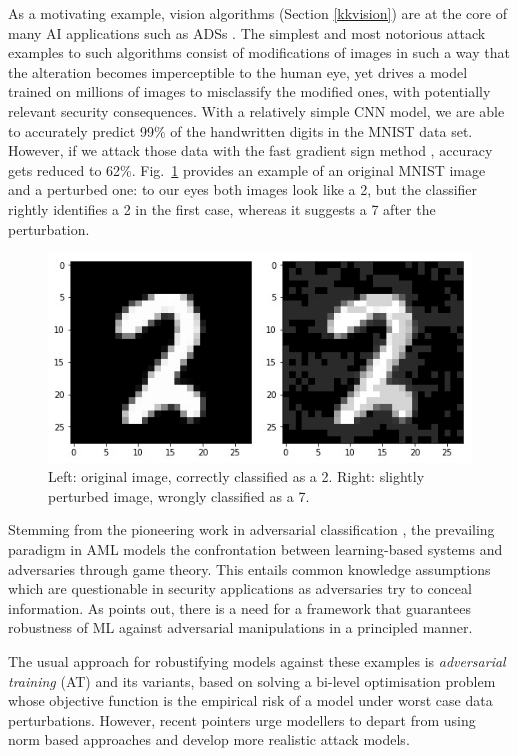 As a motivating example, vision algorithms (Section
\ref{kkvision}) are at the core of many AI 
applications such as ADSs \parencite{rumanos}. 
The simplest and most notorious attack examples to
such algorithms  
consist of modifications of images in such a way that the alteration becomes imperceptible to the human eye, yet drives a model trained on millions of images to misclassify the modified ones,
with potentially relevant security consequences.
With a relatively simple CNN model, we are able to accurately predict 99\% of the handwritten digits in the MNIST data set.
However, if we attack those data with the fast gradient sign method \parencite{szegedy2013intriguin},
accuracy gets reduced to 62\%. Fig.~\ref{fig:digits} provides an example of an original MNIST image and a perturbed one: to our eyes both images look like a 2, but the classifier rightly identifies a 2 in the first case, whereas it suggests a 7 after the perturbation. 
%
%
%
\begin{figure}[hbt]
\centering
  \includegraphics[width=.6\linewidth]{figures/27}
  \caption{Left: original image, correctly classified as a 2. Right: slightly perturbed image, wrongly classified as a 7.}
  \label{fig:digits}
\end{figure}
Stemming from the pioneering work in adversarial classification 
\parencite{dalvi2004adversarial}, the prevailing paradigm in AML models
the confrontation between learning-based systems and adversaries through game theory. 
This entails common knowledge assumptions 
\parencite{hargreaves2004game} which are 
questionable in security 
applications as adversaries try to conceal information. 
As \parencite{fan2019selective} points out, there is a need for a  framework that guarantees robustness of ML against adversarial manipulations in a principled manner. 

The usual approach for robustifying models against these examples is {\em adversarial training} (AT) \parencite{madry2018towards} and its 
variants, based on solving a 
bi-level optimisation problem whose objective function is the empirical risk of a model under worst case data perturbations. %
However, recent pointers urge modellers to depart from using 
norm based approaches \parencite{carlini2019evaluating} and develop more realistic attack models.

